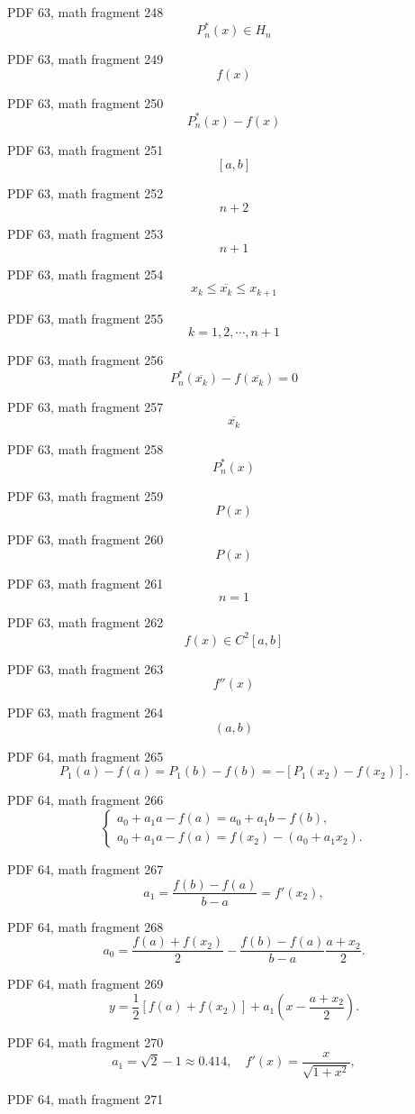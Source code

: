 \documentclass[UTF8,fontset=fandol]{ctexart}
\begin{document}
\par
PDF 63, math fragment 248
\[P_n^*(x) \in H_n\]
\par
PDF 63, math fragment 249
\[f(x)\]
\par
PDF 63, math fragment 250
\[P_n^*(x)-f(x)\]
\par
PDF 63, math fragment 251
\[[a,b]\]
\par
PDF 63, math fragment 252
\[n+2\]
\par
PDF 63, math fragment 253
\[n+1\]
\par
PDF 63, math fragment 254
\[x_k \leqslant \overline{x_k} \leqslant x_{k+1}\]
\par
PDF 63, math fragment 255
\[k=1,2,\cdots,n+1\]
\par
PDF 63, math fragment 256
\[P_n^*(\overline{x_k})-f(\overline{x_k})=0\]
\par
PDF 63, math fragment 257
\[\overline{x_k}\]
\par
PDF 63, math fragment 258
\[P_n^*(x)\]
\par
PDF 63, math fragment 259
\[P(x)\]
\par
PDF 63, math fragment 260
\[P(x)\]
\par
PDF 63, math fragment 261
\[n=1\]
\par
PDF 63, math fragment 262
\[f(x) \in C^2[a,b]\]
\par
PDF 63, math fragment 263
\[f''(x)\]
\par
PDF 63, math fragment 264
\[(a,b)\]
\par
PDF 64, math fragment 265
\[
P_1(a) - f(a) = P_1(b) - f(b) = -[P_1(x_2) - f(x_2)] .
\]
\par
PDF 64, math fragment 266
\[
\begin{cases} a_0 + a_1a - f(a) = a_0 + a_1b - f(b), \\ a_0 + a_1a - f(a) = f(x_2) - (a_0 + a_1x_2). \end{cases} \tag{3.2.6}
\]
\par
PDF 64, math fragment 267
\[
a_1 = \frac{f(b) - f(a)}{b - a} = f'(x_2), \tag{3.2.7}
\]
\par
PDF 64, math fragment 268
\[
a_0 = \frac{f(a) + f(x_2)}{2} - \frac{f(b) - f(a)}{b - a} \frac{a + x_2}{2}. \tag{3.2.8}
\]
\par
PDF 64, math fragment 269
\[
y = \frac{1}{2}[f(a) + f(x_2)] + a_1\left(x - \frac{a + x_2}{2}\right).
\]
\par
PDF 64, math fragment 270
\[
a_1 = \sqrt{2} - 1 \approx 0.414, \quad f'(x) = \frac{x}{\sqrt{1+x^2}},
\]
\par
PDF 64, math fragment 271
\end{document}
